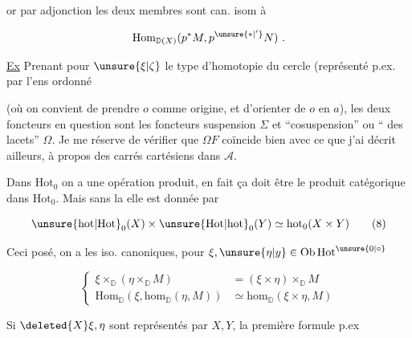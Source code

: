 
or par adjonction les deux membres sont can. isom à

\[\mathrm{Hom}_{\mathbb D(X)}(p^*M,p^{\unsure{*|'}}N)\ .\]

 \uline{Ex} Prenant pour $\unsure{\xi|\zeta}$ le type d'homotopie du cercle  (représenté p.ex. par l'ens ordonné


(où on convient de prendre $o$ comme origine, et d'orienter de $o$ en $a$), les deux foncteurs en question sont  les foncteurs suspension $\Sigma$ et ``cosuspension'' ou ``  des lacets'' $\Omega$. Je me réserve de vérifier que $\Omega F$ coïncide bien avec ce que j'ai décrit ailleurs, à propos des carrés  cartésiens dans $\mathcal A$.

Dans $\mathrm{Hot}_0$ on a une opération produit, en fait ça doit être le produit catégorique dans $\mathrm{Hot}_0$. Mais sans la  elle est donnée par

\[\unsure{\mathrm{hot}|\mathrm{Hot}}_0(X)\times\unsure{\mathrm{Hot}|\mathrm{hot}}_0(Y)\simeq\mathrm{hot}_0(X\times Y)\tag*{(8)}\]

Ceci posé, on a les iso. canoniques, pour $\xi,\unsure{\eta|y}\in\mathrm{Ob}\,\mathrm{Hot}^{\unsure{0|\circ}}$

\[
\left\{\begin{aligned}
\xi\times_{\mathbb D}(\eta\times_{\mathbb D}M)&=(\xi\times\eta)\times_{\mathbb D}M\\
\mathrm{Hom}_{\mathbb D}(\xi,\mathrm{hom}_{\mathbb D}(\eta,M))&\simeq
\mathrm{hom}_{\mathbb D}(\xi\times\eta,M)
\end{aligned}\right.\tag*{(9)}
\]

Si $\deleted{X}\xi,\eta$ sont représentés par $X,Y$, la première formule p.ex

